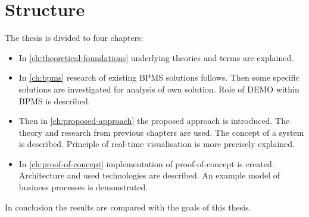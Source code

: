 \section{Structure}
The thesis is divided to four chapters:
\begin{itemize}
\item In \cref{ch:theoretical-foundations} underlying theories and terms are explained.
\item In \cref{ch:bpms} research of existing BPMS solutions follows. Then some specific solutions are investigated for analysis of own solution. Role of DEMO within BPMS is described. 
\item Then in \cref{ch:proposed-approach} the proposed approach is introduced. The theory and research from previous chapters are used. The concept of a system is described. Principle of real-time visualisation is more precisely explained. 
\item In \cref{ch:proof-of-concept} implementation of proof-of-concept is created. Architecture and used technologies are described. An example model of business processes is demonstrated.
\end{itemize}
In conclusion the results are compared with the goals of this thesis. 





